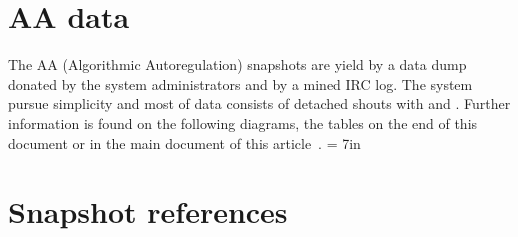 \begin{apendicesenv}
																											  \section{AA data}
																											  The AA (Algorithmic Autoregulation) snapshots are yield by a data dump donated by the system
																											  administrators and by a mined IRC log.
																											  The system pursue simplicity and most of data consists of detached
																											  shouts with  and .
																											  Further information is found on the following diagrams, the tables on
																											  the end of this document or in the main document of this
																											  article~\cite{losd}.
																													\textheight = 7in

																														      \section{Snapshot references}
																														      \label{sreferences}
																														      \pdfpageheight 10in
																														      




\end{apendicesenv}
